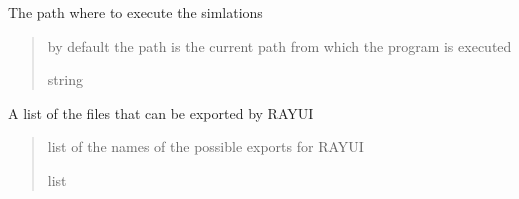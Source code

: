 \documentclass[letterpaper,10pt,english]{sphinxmanual}
\begin{document}
\begin{fulllineitems}
\begin{fulllineitems}
\end{fulllineitems}


\begin{fulllineitems}
\label{\detokenize{code_documentation:raypyng.simulate.Simulate.path}}
\pysigstartsignatures
{}
\pysigstopsignatures
\sphinxAtStartPar
The path where to execute the simlations
\begin{quote}\begin{description}
\sphinxAtStartPar
by default the path is the current path from which
the program is executed

\sphinxAtStartPar
string

\end{description}\end{quote}

\end{fulllineitems}


\begin{fulllineitems}
\label{\detokenize{code_documentation:raypyng.simulate.Simulate.possible_exports}}
\pysigstartsignatures
{}
\pysigstopsignatures
\sphinxAtStartPar
A list of the files that can be exported by RAY\sphinxhyphen{}UI
\begin{quote}\begin{description}
\sphinxAtStartPar
list of the names of the possible exports for RAY\sphinxhyphen{}UI

\sphinxAtStartPar
list

\end{description}\end{quote}

\end{fulllineitems}



\end{fulllineitems}
\end{document}
